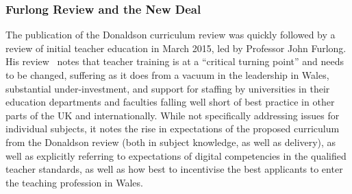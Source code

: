 \documentclass[conference]{IEEEtran}
\begin{document}

\subsubsection*{Furlong Review and the New Deal}

The publication of the Donaldson curriculum review was quickly
followed by a review of initial teacher education in March 2015, led
by Professor John Furlong. His review~\cite{Furlong:2015} notes
that teacher training is at a ``critical turning point'' and needs
to be changed, 
suffering as it does from
a vacuum in the leadership in Wales, substantial under-investment,
and support for staffing by universities in their
education departments and faculties falling well short of best
practice in other parts of the UK and internationally. While not
specifically addressing issues for individual subjects, it notes the
rise in expectations of the proposed curriculum from the Donaldson
review (both in subject knowledge, as well as delivery), as well as
explicitly referring to expectations of digital competencies in the
qualified teacher standards, as well as how best to incentivise the
best applicants to enter the teaching profession in Wales.
\end{document}
